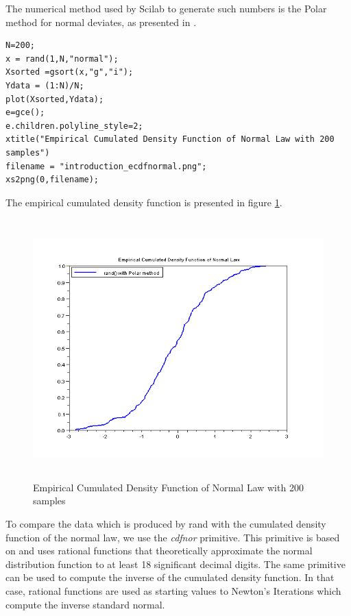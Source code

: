 The numerical method used by Scilab to generate such numbers is the Polar 
method for normal deviates, as presented in \cite{artcomputerKnuthVol2}.

\lstset{language=Scilab}
\lstset{numbers=left}
\lstset{basicstyle=\footnotesize}
\begin{lstlisting}
N=200;
x = rand(1,N,"normal");
Xsorted =gsort(x,"g","i"); 
Ydata = (1:N)/N;
plot(Xsorted,Ydata);
e=gce();
e.children.polyline_style=2;
xtitle("Empirical Cumulated Density Function of Normal Law with 200 samples")
filename = "introduction_ecdfnormal.png";
xs2png(0,filename);
\end{lstlisting}

The empirical cumulated density function 
is presented in figure \ref{introduction_ecdfnormal}.

\begin{figure}[htbp]
\begin{center}
\includegraphics[height=10cm]{introduction_ecdfnormal.png}
\end{center}
\caption{Empirical Cumulated Density Function of Normal Law with 200 samples}
\label{introduction_ecdfnormal}
\end{figure}

To compare the data which is produced by rand with the 
cumulated density function of the normal law, we use the 
\emph{cdfnor} primitive. This primitive is based on \cite{Algorithm715}
and uses rational functions that theoretically approximate the normal 
distribution function to at least 18 significant decimal digits. The same 
primitive can be used to compute the inverse of the cumulated density 
function. In that case, rational functions are used as starting values to 
Newton's Iterations which compute the inverse standard normal.

